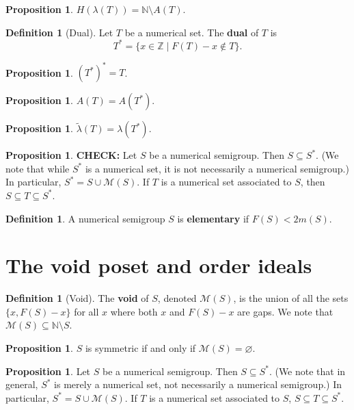 \documentclass{article}
\theoremstyle{definition}
\theoremstyle{definition}
\newtheorem{defn}[thm]{Definition}
\theoremstyle{definition}
\newtheorem{prop}[thm]{Proposition}
\begin{document}
\begin{prop}
    $H(\lambda(T)) = \mathbb{N} \setminus A(T)$.
\end{prop}

\begin{defn}[Dual]
    Let $T$ be a numerical set. The \textbf{dual} of $T$ is 
    $$T^* = \{x \in \mathbb{Z} \mid F(T) - x \notin T \}.$$
\end{defn}

\begin{prop}
    $(T^*)^* = T$.
\end{prop}

\begin{prop}
    $A(T) = A(T^*)$.
\end{prop}

\begin{prop}
    $\tilde{\lambda}(T) = \lambda(T^*)$.
\end{prop}

\begin{prop}
    \textbf{CHECK:} Let $S$ be a numerical semigroup. Then $S \subseteq S^*$. (We note that while $S^*$ is a numerical set, it is not necessarily a numerical semigroup.) In particular, $S^* = S\cup\mathcal{M}(S)$. If $T$ is a numerical set associated to $S$, then $S\subseteq T \subseteq S^*$.
\end{prop}

\begin{defn}
    A numerical semigroup $S$ is \textbf{elementary} if $F(S) < 2m(S)$.  
\end{defn}

\section{The void poset and order ideals}

\begin{defn}[Void]
    The \textbf{void} of $S$, denoted $\mathcal{M}(S)$, is the union of all the sets $\{x, F(S) -x\}$ for all $x$ where both $x$ and $F(S)-x$ are gaps. We note that $\mathcal{M}(S) \subseteq \mathbb{N} \setminus S$.
\end{defn}

\begin{prop}
    $S$ is symmetric if and only if $\mathcal{M}(S) = \varnothing$.
\end{prop}

\begin{prop}
    Let $S$ be a numerical semigroup. Then $S \subseteq S^*$. (We note that in general, $S^*$ is merely a numerical set, not necessarily a numerical semigroup.) In particular, $S^* = S\cup \mathcal{M}(S)$. If $T$ is a numerical set associated to $S$, $S \subseteq T \subseteq S^*$.
\end{prop}
\end{document}
